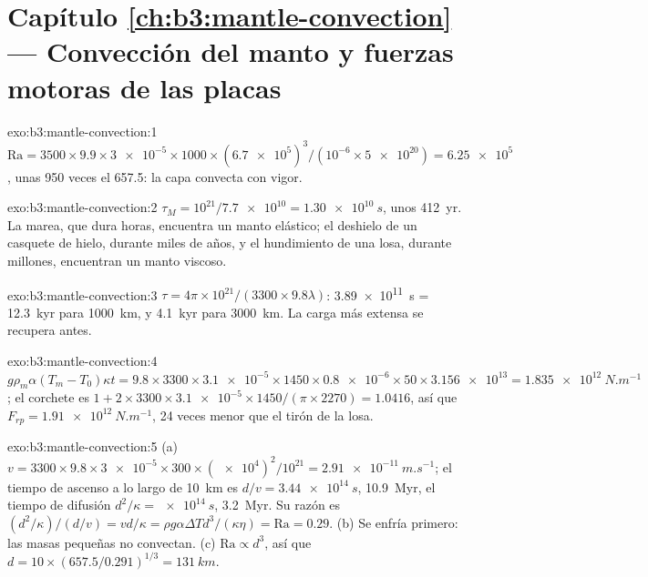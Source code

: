 \section*{Capítulo \ref{ch:b3:mantle-convection} --- Convección del manto y fuerzas motoras de las placas}

\begin{solution}{exo:b3:mantle-convection:1}
$\mathrm{Ra} = 3500\times9.9\times\num{3e-5}\times1000\times(\num{6.7e5})^3/
(10^{-6}\times\num{5e20}) = \num{6.25e5}$, unas 950 veces el 
657.5: la capa convecta con vigor.
\end{solution}

\begin{solution}{exo:b3:mantle-convection:2}
$\tau_M = 10^{21}/\num{7.7e10} = \qty{1.30e10}{s}$, unos \qty{412}{yr}. La
marea, que dura horas, encuentra un manto elástico; el deshielo de un casquete de hielo,
durante miles de años, y el hundimiento de una losa, durante millones, encuentran un
manto viscoso.
\end{solution}

\begin{solution}{exo:b3:mantle-convection:3}
$\tau = 4\pi\times10^{21}/(3300\times9.8\lambda)$: \qty{3.89e11}{s} =
\qty{12.3}{kyr} para \qty{1000}{km}, y \qty{4.1}{kyr} para \qty{3000}{km}. La
carga más extensa se recupera antes.
\end{solution}

\begin{solution}{exo:b3:mantle-convection:4}
$g\rho_m\alpha(T_m - T_0)\kappa t = 9.8\times3300\times\num{3.1e-5}\times1450
\times\num{0.8e-6}\times50\times\num{3.156e13} = \qty{1.835e12}{N.m^{-1}}$; el
corchete es $1 + 2\times3300\times\num{3.1e-5}\times1450/(\pi\times2270) = 1.0416$,
así que $F_{rp} = \qty{1.91e12}{N.m^{-1}}$, 24 veces menor que el tirón de la losa.
\end{solution}

\begin{solution}{exo:b3:mantle-convection:5}
(a) $v = 3300\times9.8\times\num{3e-5}\times300\times(\num{e4})^2/10^{21} =
\qty{2.91e-11}{m.s^{-1}}$; el tiempo de ascenso a lo largo de \qty{10}{km} es $d/v =
\qty{3.44e14}{s}$, \qty{10.9}{Myr}, el tiempo de difusión $d^2/\kappa =
\qty{e14}{s}$, \qty{3.2}{Myr}. Su razón es $(d^2/\kappa)/(d/v) =
vd/\kappa = \rho g\alpha\Delta Td^3/(\kappa\eta) = \mathrm{Ra} = 0.29$. (b) Se
enfría primero: las masas pequeñas no convectan. (c) $\mathrm{Ra} \propto d^3$, así que $d =
10\times(657.5/0.291)^{1/3} = \qty{131}{km}$.
\end{solution}


